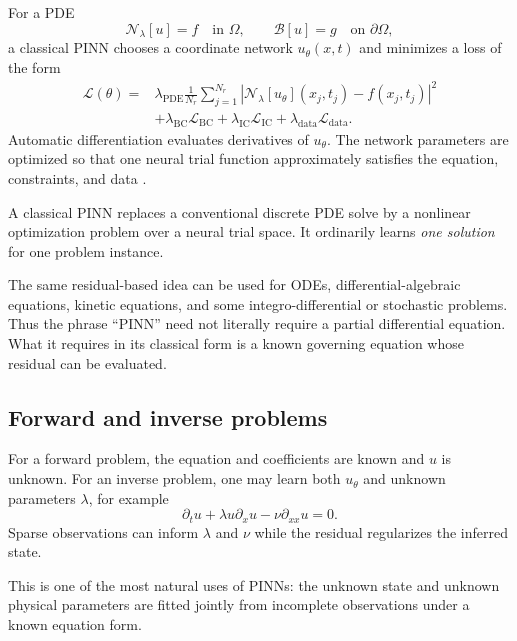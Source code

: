 \documentclass[11pt]{article}
\newcommand{\N}{\mathcal{N}}
\begin{document}
For a PDE
\begin{equation}
 \N_\lambda[u]=f
 \quad\text{in }\Omega,
 \qquad
 \mathcal{B}[u]=g
 \quad\text{on }\partial\Omega,
\end{equation}
a classical PINN chooses a coordinate network \(u_\theta(x,t)\) and minimizes a loss of the form
\begin{equation}
\begin{aligned}
 \mathcal{L}(\theta)
 ={}&
 \lambda_{\mathrm{PDE}}
 \frac1{N_r}\sum_{j=1}^{N_r}
 \left|
 \N_\lambda[u_\theta](x_j,t_j)-f(x_j,t_j)
 \right|^2\\
 &+\lambda_{\mathrm{BC}}\mathcal{L}_{\mathrm{BC}}
 +\lambda_{\mathrm{IC}}\mathcal{L}_{\mathrm{IC}}
 +\lambda_{\mathrm{data}}\mathcal{L}_{\mathrm{data}}.
\end{aligned}
\end{equation}
Automatic differentiation evaluates derivatives of \(u_\theta\). The network parameters are optimized so that one neural trial function approximately satisfies the equation, constraints, and data \citep{raissi2019pinn}.

\begin{bigidea}
A classical PINN replaces a conventional discrete PDE solve by a nonlinear optimization problem over a neural trial space. It ordinarily learns \emph{one solution} for one problem instance.
\end{bigidea}

The same residual-based idea can be used for ODEs, differential-algebraic equations, kinetic equations, and some integro-differential or stochastic problems. Thus the phrase ``PINN'' need not literally require a partial differential equation. What it requires in its classical form is a known governing equation whose residual can be evaluated.

\subsection{Forward and inverse problems}

For a forward problem, the equation and coefficients are known and \(u\) is unknown. For an inverse problem, one may learn both \(u_\theta\) and unknown parameters \(\lambda\), for example
\[
 \partial_tu+\lambda u\partial_xu-\nu\partial_{xx}u=0.
\]
Sparse observations can inform \(\lambda\) and \(\nu\) while the residual regularizes the inferred state.

This is one of the most natural uses of PINNs: the unknown state and unknown physical parameters are fitted jointly from incomplete observations under a known equation form.
\end{document}
